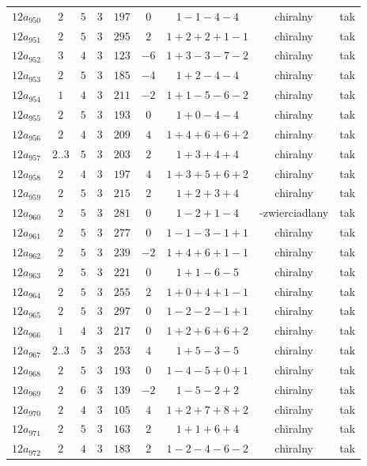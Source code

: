 \begin{longtable}{ccccccccc}
$12a_{950}$ & $2$ & $5$ & $3$ & $197$ & $0$ & $1-1-4-4$ & chiralny & tak \\
$12a_{951}$ & $2$ & $5$ & $3$ & $295$ & $2$ & $1+2+2+1-1$ & chiralny & tak \\
$12a_{952}$ & $3$ & $4$ & $3$ & $123$ & $-6$ & $1+3-3-7-2$ & chiralny & tak \\
$12a_{953}$ & $2$ & $5$ & $3$ & $185$ & $-4$ & $1+2-4-4$ & chiralny & tak \\
$12a_{954}$ & $1$ & $4$ & $3$ & $211$ & $-2$ & $1+1-5-6-2$ & chiralny & tak \\
$12a_{955}$ & $2$ & $5$ & $3$ & $193$ & $0$ & $1+0-4-4$ & chiralny & tak \\
$12a_{956}$ & $2$ & $4$ & $3$ & $209$ & $4$ & $1+4+6+6+2$ & chiralny & tak \\
$12a_{957}$ & $2..3$ & $5$ & $3$ & $203$ & $2$ & $1+3+4+4$ & chiralny & tak \\
$12a_{958}$ & $2$ & $4$ & $3$ & $197$ & $4$ & $1+3+5+6+2$ & chiralny & tak \\
$12a_{959}$ & $2$ & $5$ & $3$ & $215$ & $2$ & $1+2+3+4$ & chiralny & tak \\
$12a_{960}$ & $2$ & $5$ & $3$ & $281$ & $0$ & $1-2+1-4$ & -zwierciadlany & tak \\
$12a_{961}$ & $2$ & $5$ & $3$ & $277$ & $0$ & $1-1-3-1+1$ & chiralny & tak \\
$12a_{962}$ & $2$ & $5$ & $3$ & $239$ & $-2$ & $1+4+6+1-1$ & chiralny & tak \\
$12a_{963}$ & $2$ & $5$ & $3$ & $221$ & $0$ & $1+1-6-5$ & chiralny & tak \\
$12a_{964}$ & $2$ & $5$ & $3$ & $255$ & $2$ & $1+0+4+1-1$ & chiralny & tak \\
$12a_{965}$ & $2$ & $5$ & $3$ & $297$ & $0$ & $1-2-2-1+1$ & chiralny & tak \\
$12a_{966}$ & $1$ & $4$ & $3$ & $217$ & $0$ & $1+2+6+6+2$ & chiralny & tak \\
$12a_{967}$ & $2..3$ & $5$ & $3$ & $253$ & $4$ & $1+5-3-5$ & chiralny & tak \\
$12a_{968}$ & $2$ & $5$ & $3$ & $193$ & $0$ & $1-4-5+0+1$ & chiralny & tak \\
$12a_{969}$ & $2$ & $6$ & $3$ & $139$ & $-2$ & $1-5-2+2$ & chiralny & tak \\
$12a_{970}$ & $2$ & $4$ & $3$ & $105$ & $4$ & $1+2+7+8+2$ & chiralny & tak \\
$12a_{971}$ & $2$ & $5$ & $3$ & $163$ & $2$ & $1+1+6+4$ & chiralny & tak \\
$12a_{972}$ & $2$ & $4$ & $3$ & $183$ & $2$ & $1-2-4-6-2$ & chiralny & tak \\

\end{longtable}
